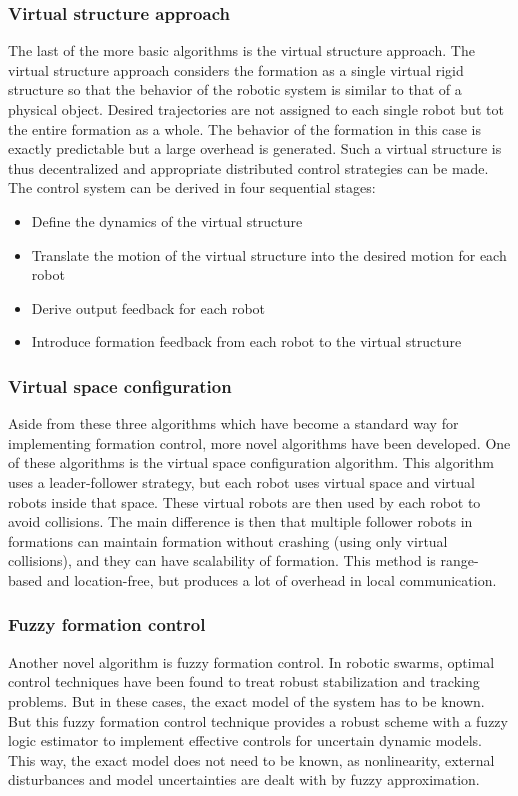 \subsubsection{Virtual structure approach}
The last of the more basic algorithms is the virtual structure approach. 
The virtual structure approach considers the formation as a single virtual rigid structure so that the behavior of the robotic system is similar to that of a physical object. 
Desired trajectories are not assigned to each single robot but tot the entire formation as a whole. 
The behavior of the formation in this case is exactly predictable but a large overhead is generated. \cite{consolini2008leader}
Such a virtual structure is thus decentralized and appropriate distributed control strategies can be made. \cite{ren2004decentralized}
The control system can be derived in four sequential stages: \cite{do2007nonlinear}
\begin{itemize}
	\item Define the dynamics of the virtual structure 
	\item Translate the motion of the virtual structure into the desired motion for each robot
	\item Derive output feedback for each robot
	\item Introduce formation feedback from each robot to the virtual structure
\end{itemize} 

\subsubsection{Virtual space configuration}
Aside from these three algorithms which have become a standard way for implementing formation control, more novel algorithms have been developed. 
One of these algorithms is the virtual space configuration algorithm. \cite{wee2013formation}
This algorithm uses a leader-follower strategy, but each robot uses virtual space and virtual robots inside that space.
These virtual robots are then used by each robot to avoid collisions. 
The main difference is then that multiple follower robots in formations can maintain formation without crashing (using only virtual collisions), and they can have scalability of formation. 
This method is range-based and location-free, but produces a lot of overhead in local communication.

\subsubsection{Fuzzy formation control}
Another novel algorithm is fuzzy formation control.\cite{ranjbar2012novel}
In robotic swarms, optimal control techniques have been found to treat robust stabilization and tracking problems. 
But in these cases, the exact model of the system has to be known. 
But this fuzzy formation control technique provides a robust scheme with a fuzzy logic estimator to implement effective controls for uncertain dynamic models.
This way, the exact model does not need to be known, as nonlinearity, external disturbances and model uncertainties are dealt with by fuzzy approximation.

